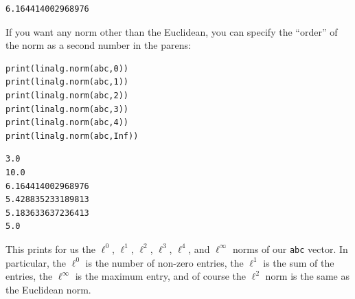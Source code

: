 \begin{Verbatim}[fontsize=\small,samepage=true,frame=leftline,framesep=5mm,framerule=1mm]
6.164414002968976
\end{Verbatim}

If you want any norm other than the Euclidean, you can specify the ``order'' of
the norm as a second number in the parens:

\begin{Verbatim}[fontsize=\small,samepage=true,frame=single,framesep=3mm]
print(linalg.norm(abc,0))
print(linalg.norm(abc,1))
print(linalg.norm(abc,2))
print(linalg.norm(abc,3))
print(linalg.norm(abc,4))
print(linalg.norm(abc,Inf))
\end{Verbatim}
\vspace{-.2in}

\begin{Verbatim}[fontsize=\small,samepage=true,frame=leftline,framesep=5mm,framerule=1mm]
3.0
10.0
6.164414002968976
5.428835233189813
5.183633637236413
5.0
\end{Verbatim}

This prints for us the $\ell^0$, $\ell^1$, $\ell^2$, $\ell^3$, $\ell^4$, and
$\ell^\infty$ norms of our \texttt{abc} vector. In particular, the $\ell^0$ is
the number of non-zero entries, the $\ell^1$ is the sum of the entries, the
$\ell^\infty$ is the maximum entry, and of course the $\ell^2$ norm is the same
as the Euclidean norm.
